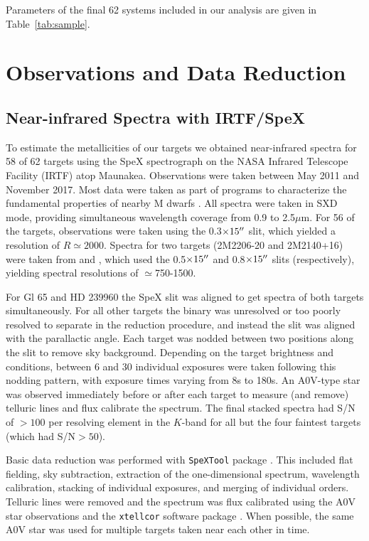 \documentclass[twocolumn]{aastex62}
\begin{document}
Parameters of the final 62 systems included in our analysis are given in Table~\ref{tab:sample}.

\section{Observations and Data Reduction}\label{sec:obs} 

\subsection{Near-infrared Spectra with IRTF/SpeX}

To estimate the metallicities of our targets we obtained near-infrared spectra for 58 of 62 targets using the SpeX spectrograph \citep{Rayner:2003} on the NASA Infrared Telescope Facility (IRTF) atop Maunakea. Observations were taken between May 2011 and November 2017. Most data were taken as part of programs to characterize the fundamental properties of nearby M dwarfs \citep[e.g.,][]{Mann2013c,Gaidos2014,Terrien2015}. All spectra were taken in SXD mode, providing simultaneous wavelength coverage from 0.9 to 2.5$\mu$m. For 56 of the targets, observations were taken using the 0.3$\times15\mbox{$^{\prime\prime}$}$ slit, which yielded a resolution of $R\simeq2000$. Spectra for two targets (2M2206-20 and 2M2140+16) were taken from \citet{2009ApJ...706..328D} and \citet{Dupuy2012}, which used the 0.5$\times15\mbox{$^{\prime\prime}$}$ and 0.8$\times15\mbox{$^{\prime\prime}$}$ slits (respectively), yielding spectral resolutions of $\simeq$750-1500. 

For Gl 65 and HD 239960 the SpeX slit was aligned to get spectra of both targets simultaneously. For all other targets the binary was unresolved or too poorly resolved to separate in the reduction procedure, and instead the slit was aligned with the parallactic angle. Each target was nodded between two positions along the slit to remove sky background. Depending on the target brightness and conditions, between 6 and 30 individual exposures were taken following this nodding pattern, with exposure times varying from 8s to 180s. An A0V-type star was observed immediately before or after each target to measure (and remove) telluric lines and flux calibrate the spectrum. The final stacked spectra had S/N of $>100$ per resolving element in the $K$-band for all but the four faintest targets (which had S/N$>50$). 

Basic data reduction was performed with {\tt SpeXTool} package \citep{Cushing2004}. This included flat fielding, sky subtraction, extraction of the one-dimensional spectrum, wavelength calibration, stacking of individual exposures, and merging of individual orders. Telluric lines were removed and the spectrum was flux calibrated using the A0V star observations and the {\tt xtellcor} software package \citep{Vacca2003}. When possible, the same A0V star was used for multiple targets taken near each other in time. 
\end{document}
